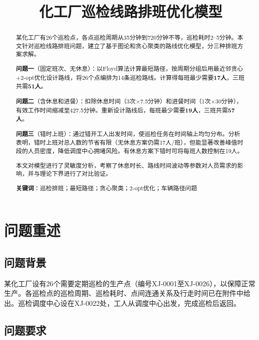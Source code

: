 \documentclass[12pt,a4paper]{article}
\title{\LARGE\textbf{化工厂巡检线路排班优化模型}}
\date{}
\begin{document}
\maketitle

\begin{abstract}
某化工厂有26个巡检点，各点巡检周期从35分钟到720分钟不等，巡检耗时2--5分钟。本文针对巡检线路排班问题，建立了基于图论和贪心聚类的路线优化模型，分三种排班方案求解。

\textbf{问题一}（固定班次、无休息）：以Floyd算法计算最短路径，按周期分组后用最近邻贪心+2-opt优化设计路线，将26个点编排为14条巡检路线。计算得每班最少需要\textbf{17人}，三班共需\textbf{51人}。

\textbf{问题二}（含休息和进餐）：扣除休息时间（3次$\times$7.5分钟）和进餐时间（1次$\times$30分钟），有效工作时间缩减至427.5分钟。重新设计路线后，每班最少需要\textbf{19人}，三班共需\textbf{57人}。

\textbf{问题三}（错时上班）：通过错开工人出发时间，使巡检任务在时间轴上均匀分布。分析表明，错时上班对总人数的节省有限（无休息方案仍需17人/班），但能显著改善峰值时段的人员密度，降低调度中心拥堵风险。有休息方案下错时可将每班人数控制在19人。

本文对模型进行了灵敏度分析，考察了休息时长、路线时间波动等参数对人员需求的影响，并与理论下界进行了对比验证。

\textbf{关键词}：巡检排班；最短路径；贪心聚类；2-opt优化；车辆路径问题
\end{abstract}

\newpage
\tableofcontents
\newpage

\section{问题重述}

\subsection{问题背景}

某化工厂设有26个需要定期巡检的生产点（编号XJ-0001至XJ-0026），以保障正常生产。各巡检点的巡检周期、巡检耗时、点间连通关系及行走时间已在附件中给出。巡检调度中心设在XJ-0022处，工人从调度中心出发，完成巡检后返回。

\subsection{问题要求}
\end{document}

